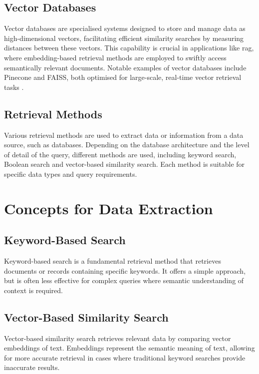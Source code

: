 \begin{definition}
\subsection{Vector Databases}\label{sec:vector-databases}
Vector databases are specialised systems designed to store and manage data as high-dimensional vectors, facilitating efficient similarity searches by measuring distances between these vectors. 
This capability is crucial in applications like \ac{rag}, where embedding-based retrieval methods are employed to swiftly access semantically relevant documents. 
Notable examples of vector databases include Pinecone and FAISS, both optimised for large-scale, real-time vector retrieval tasks \citep{Johnson2019}.

\subsection{Retrieval Methods}\label{sec:retrieval-methods}

Various retrieval methods are used to extract data or information from a data source, such as databases. 
Depending on the database architecture and the level of detail of the query, different methods are used, including keyword search, Boolean search and vector-based similarity search. Each method is suitable for specific data types and query requirements.
\section{Concepts for Data Extraction}\label{sec:data-extraction-concepts}

\subsection{Keyword-Based Search}\label{sec:keyword-search}
Keyword-based search is a fundamental retrieval method that retrieves documents or records containing specific keywords. 
It offers a simple approach, but is often less effective for complex queries where semantic understanding of context is required.

\subsection{Vector-Based Similarity Search}\label{sec:vector-similarity-search}
Vector-based similarity search retrieves relevant data by comparing vector embeddings of text. 
Embeddings represent the semantic meaning of text, allowing for more accurate retrieval in cases where traditional keyword searches provide inaccurate results.


\end{definition}
